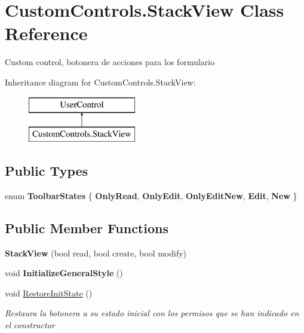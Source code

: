 \hypertarget{class_custom_controls_1_1_stack_view}{}\section{Custom\+Controls.\+Stack\+View Class Reference}
\label{class_custom_controls_1_1_stack_view}


Custom control, botonera de acciones para los formulario  


Inheritance diagram for Custom\+Controls.\+Stack\+View\+:\begin{figure}[H]
\begin{center}
\leavevmode
\includegraphics[height=2.000000cm]{class_custom_controls_1_1_stack_view}
\end{center}
\end{figure}
\subsection*{Public Types}
\begin{DoxyCompactItemize}
\item 
\mbox{\label{class_custom_controls_1_1_stack_view_ad33a71dff7cc2c25851d7cd5d75fb3c8}} 
enum {\bfseries Toolbar\+States} \{ \newline
{\bfseries Only\+Read}, 
{\bfseries Only\+Edit}, 
{\bfseries Only\+Edit\+New}, 
{\bfseries Edit}, 
\newline
{\bfseries New}
 \}
\end{DoxyCompactItemize}
\subsection*{Public Member Functions}
\begin{DoxyCompactItemize}
\item 
\mbox{\label{class_custom_controls_1_1_stack_view_af1226e4d40a4f58799de5b48de95c275}} 
{\bfseries Stack\+View} (bool read, bool create, bool modify)
\item 
\mbox{\label{class_custom_controls_1_1_stack_view_a40e9b83536de3aa4a3fd7e40bfce0246}} 
void {\bfseries Initialize\+General\+Style} ()
\item 
void \mbox{\hyperlink{class_custom_controls_1_1_stack_view_aa6ee6db47352fbb47bc1292ea7f58611}{Restore\+Init\+State}} ()
\begin{DoxyCompactList}\small\item\em Restaura la botonera a su estado inicial con los permisos que se han indicado en el constructor \end{DoxyCompactList}\end{DoxyCompactItemize}
